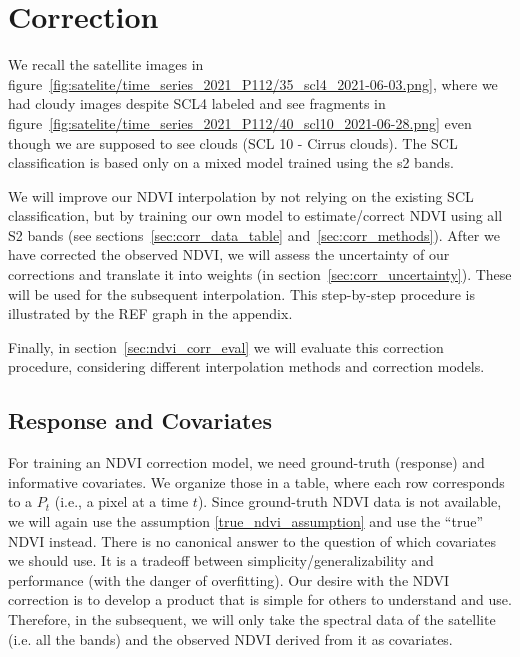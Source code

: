 \section{Correction}{
    \label{sec:corr_correction}
    {
        We recall the satellite images in figure~\ref{fig:satelite/time_series_2021_P112/35_scl4_2021-06-03.png}, where we had cloudy images despite SCL4 labeled and see fragments in figure~\ref{fig:satelite/time_series_2021_P112/40_scl10_2021-06-28.png} even though we are supposed to see clouds (SCL 10 - Cirrus clouds). The SCL classification is based only on a mixed model trained using the s2 bands.
        
        We will improve our NDVI interpolation by not relying on the existing SCL classification, but by training our own model to estimate/correct NDVI using all S2 bands (see sections~\ref{sec:corr_data_table} and~\ref{sec:corr_methods}). After we have corrected the observed NDVI, we will assess the uncertainty of our corrections and translate it into weights (in section~\ref{sec:corr_uncertainty}). These will be used for the subsequent interpolation. This step-by-step procedure is illustrated by the REF graph in the appendix.

        Finally, in section~\ref{sec:ndvi_corr_eval} we will evaluate this correction procedure, considering different interpolation methods and correction models.
    }

    \subsection{Response and Covariates}{
        \label{sec:corr_data_table}

        For training an NDVI correction model, we need ground-truth (response) and informative covariates. We organize those in a table, where each row corresponds to a $P_t$ (i.e., a pixel at a time $t$). 
        Since ground-truth NDVI data is not available, we will again use the assumption \ref{true_ndvi_assumption} and use the ``true'' NDVI instead. There is no canonical answer to the question of which covariates we should use. It is a tradeoff between simplicity/generalizability and performance (with the danger of overfitting). 
        Our desire with the NDVI correction is to develop a product that is simple for others to understand and use. Therefore, in the subsequent, we will only take the spectral data of the satellite (i.e. all the bands) and the observed NDVI derived from it as covariates. 
    }    

}
